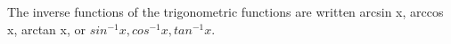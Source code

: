 The inverse functions of the trigonometric functions are written arcsin x, arccos x, 
arctan x, or $sin^{-1}x, cos^{-1}x, tan^{-1}x.$ 
